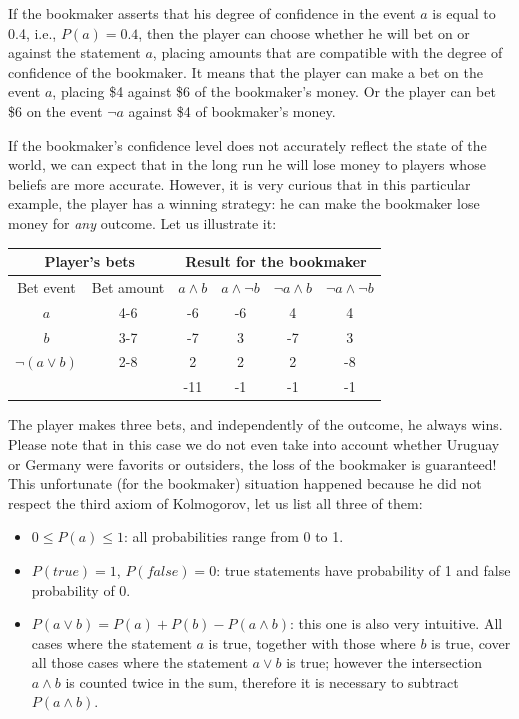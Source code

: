 \documentclass[notitlepage]{report}
\begin{document}
If the bookmaker asserts that his degree of confidence in the event $a$ is equal to 0.4, i.e., $P(a) = 0.4$, 
then the player can choose whether he will bet on or against the statement $a$,
placing amounts that are compatible with the degree of confidence of the bookmaker.
It means that the player can make a bet on the event $a$, placing \$4 against \$6 of the bookmaker's money.
Or the player can bet \$6 on the event $\neg a$ against \$4 of bookmaker's money.

If the bookmaker's confidence level does not accurately reflect the state of the world, 
we can expect that in the long run he will lose money to players whose beliefs are more accurate.
However, it is very curious that in this particular example, the player has a winning strategy: he can make the bookmaker lose money for \textit{any} outcome.
Let us illustrate it:

\vspace{2mm}
\begin{tabular}{cccccc}
	\multicolumn{2}{c}{Player's bets}  &  \multicolumn{4}{c}{Result for the bookmaker} \\
	\hline
	{\tiny Bet event} & {\tiny Bet amount} & {\tiny $a\wedge b$} & {\tiny $a\wedge \neg b$} &  {\tiny $\neg a\wedge b$} &  {\tiny $\neg a\wedge\neg b$} \\
	\hline
	$a$             & 4-6 & -6 & -6 &  4 &  4 \\
	$b$             & 3-7 & -7 &  3 & -7 &  3 \\
	$\neg(a\vee b)$ & 2-8 &  2 &  2 &  2 & -8 \\
	\hline
	&     &-11 & -1 & -1 & -1
\end{tabular}
\vspace{2mm}

The player makes three bets, and independently of the outcome, he always wins. 
Please note that in this case we do not even take into account whether Uruguay or Germany were favorits or outsiders, 
the loss of the bookmaker is guaranteed! 
This unfortunate (for the bookmaker) situation happened because he did not respect the third axiom of Kolmogorov, let us list all three of them:
\begin{itemize}
\item $0\leq P(a)\leq 1$: all probabilities range from 0 to 1.
\item $P(true)=1$, $P(false) = 0$: true statements have probability of 1 and false probability of 0.
\item $P(a\vee b) = P(a) + P(b) - P(a\wedge b)$: this one is also very intuitive.
All cases where the statement $a$ is true, together with those where $b$ is true,
cover all those cases where the statement $a\vee b$ is true; however the intersection $a\wedge b$ is counted twice in the sum, therefore it is necessary to subtract $P(a\wedge b)$.
\end{itemize}
\end{document}
